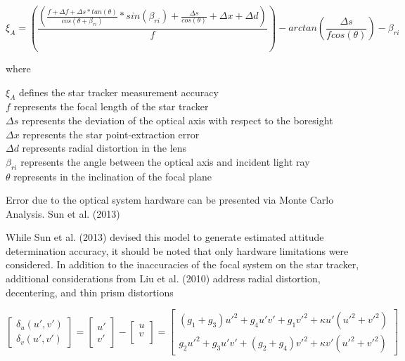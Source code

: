\begin{equation} \label{centroid_eq}
\xi_{A} = \left( \dfrac {\left( \frac {f + \Delta f + \Delta s * tan\left(\theta\right)} {cos\left( \theta + \beta_{ri} \right)} * sin\left(\beta_{ri}\right) + \frac{\Delta s} {cos\left( \theta \right)} + \Delta x + \Delta d \right)} {f} \right)- arctan\left( \frac {\Delta s} {f cos(\theta)} \right) - \beta_{ri}
\end{equation}

where
\begin{center}
    $\xi_{A}$ defines the star tracker measurement accuracy\\
    $f$ represents the focal length of the star tracker\\
    $\Delta s$ represents the deviation of the optical axis with respect to the boresight\\
    $\Delta x$ represents the star point-extraction error\\
    $\Delta d$ represents radial distortion in the lens\\
    $\beta_{ri}$ represents the angle between the optical axis and incident light ray\\
    $\theta$ represents in the inclination of the focal plane
\end{center}

\par \qquad Error due to the optical system hardware can be presented via Monte Carlo Analysis. Sun et al. (2013) 

\par \qquad While Sun et al. (2013) devised this model to generate estimated attitude determination accuracy, it should be noted that only hardware limitations were considered.
In addition to the inaccuracies of the focal system on the star tracker, additional considerations from Liu et al. (2010) address radial distortion, decentering, and thin prism distortions \cite{novel_approach_for_calibration}

\begin{equation}
    \begin{bmatrix}
        \delta_u(u', v') \\
        \delta_v(u', v')    
    \end{bmatrix}
    =
    \begin{bmatrix}
        u' \\
        v'
    \end{bmatrix}
    -
    \begin{bmatrix}
        u \\
        v \\
    \end{bmatrix}
    =
    \begin{bmatrix}
        (g_1 + g_3)u'^2 + g_4u'v' + g_1v'^2 + \kappa u'(u'^2 + v'^2) \\
        g_2u'^2 + g_3u'v' + (g_2 + g_4)v'^2 + \kappa v'(u'^2 + v'^2)
    \end{bmatrix}
\end{equation}

